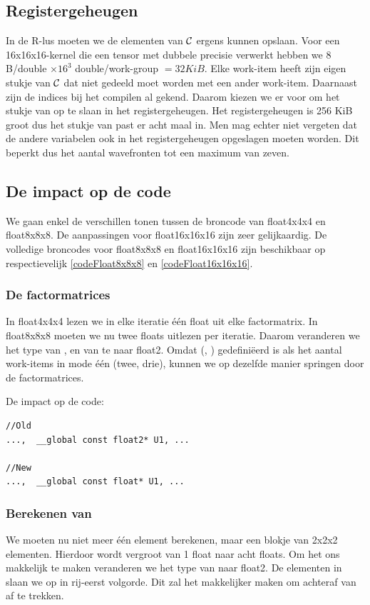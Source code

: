 \subsection{Registergeheugen}
In de R-lus moeten we de elementen van $\mathcal{C}$ ergens kunnen opslaan. Voor een 16x16x16-kernel die een tensor met dubbele precisie verwerkt hebben we $8$ B/double $\times 16^3$ double/work-group $= 32KiB$. Elke work-item heeft zijn eigen stukje van $\mathcal{C}$ dat niet gedeeld moet worden met een ander work-item. Daarnaast zijn de indices bij het compilen al gekend. Daarom kiezen we er voor om het stukje van \CC{} op te slaan in het registergeheugen. Het registergeheugen is 256 KiB groot dus het stukje van \CC{} past er acht maal in.  Men mag echter niet vergeten dat de andere variabelen ook in het registergeheugen opgeslagen moeten worden.  Dit beperkt dus het aantal wavefronten tot een maximum van zeven. 

\subsection{De impact op de code}
We gaan enkel de verschillen tonen tussen de broncode van float4x4x4 en float8x8x8. De aanpassingen voor float16x16x16 zijn zeer gelijkaardig. De volledige broncodes voor float8x8x8 en float16x16x16 zijn beschikbaar op respectievelijk \ref{codeFloat8x8x8} en \ref{codeFloat16x16x16}.
 
\subsubsection{De factormatrices}
In float4x4x4 lezen we in elke iteratie \'e\'en float uit elke factormatrix. In float8x8x8 moeten we nu twee floats uitlezen per iteratie. Daarom veranderen we het type van ,  en van  te naar float2. Omdat  (, ) gedefini\"eerd is als het aantal work-items in mode \'e\'en (twee, drie), kunnen we op dezelfde manier springen door de factormatrices.

De impact op de code:
\begin{lstlisting}
//Old
...,  __global const float2* U1, ...

//New
...,  __global const float* U1, ...
\end{lstlisting}

\subsubsection{Berekenen van \CC{}}
We moeten nu niet meer \'e\'en element berekenen, maar een blokje van 2x2x2 elementen. Hierdoor wordt \CC{} vergroot van 1 float naar acht floats. Om het ons makkelijk te maken veranderen we het type van \CC{} naar float2. De elementen in \CC{} slaan we op in rij-eerst volgorde. Dit zal het makkelijker maken om achteraf \TT{} van \CC{} af te trekken.

